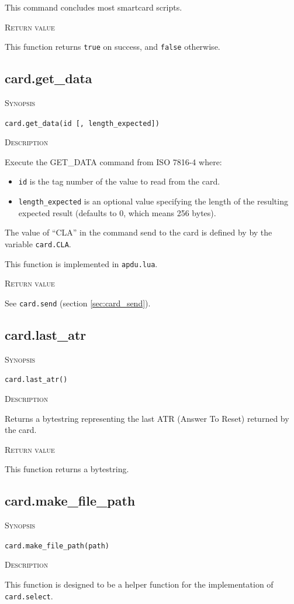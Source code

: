 \documentclass[11pt]{report}
\newcommand{\mansection}[1]{\vspace{0.5em}\par\noindent\textsc{#1}\vspace{0.5em}\par}
\newcommand{\syn}[1]{\texttt{#1}}
\begin{document}
  This command concludes most smartcard scripts.

\mansection{Return value}
  This function returns \syn{true} on success, and \syn{false} otherwise.

\subsection{card.get\_data}

\mansection{Synopsis}
\syn{card.get\_data(id [, length\_expected])}


\mansection{Description}
  Execute the GET\_DATA command from ISO 7816-4 where:
  \begin{itemize}
  \item{\syn{id} is the tag number of the value to read from the card.}
  \item{\syn{length\_expected} is an optional value specifying the length of the resulting expected result (defaults to 0, which means 256 bytes).}
  \end{itemize}

  The value of ``CLA'' in the command send to the card is defined by by the variable \syn{card.CLA}.

  This function is implemented in \syn{apdu.lua}.

\mansection{Return value}
  See \syn{card.send} (section \ref{sec:card_send}).


\subsection{card.last\_atr}

\mansection{Synopsis}
\syn{card.last\_atr()}

\mansection{Description}
  Returns a bytestring representing the last ATR (Answer To Reset) returned by the card.

\mansection{Return value}
  This function returns a bytestring.

\subsection{card.make\_file\_path}

\mansection{Synopsis}
\syn{card.make\_file\_path(path)}

\mansection{Description}
  This function is designed to be a helper function for the implementation of \syn{card.select}.
\end{document}
